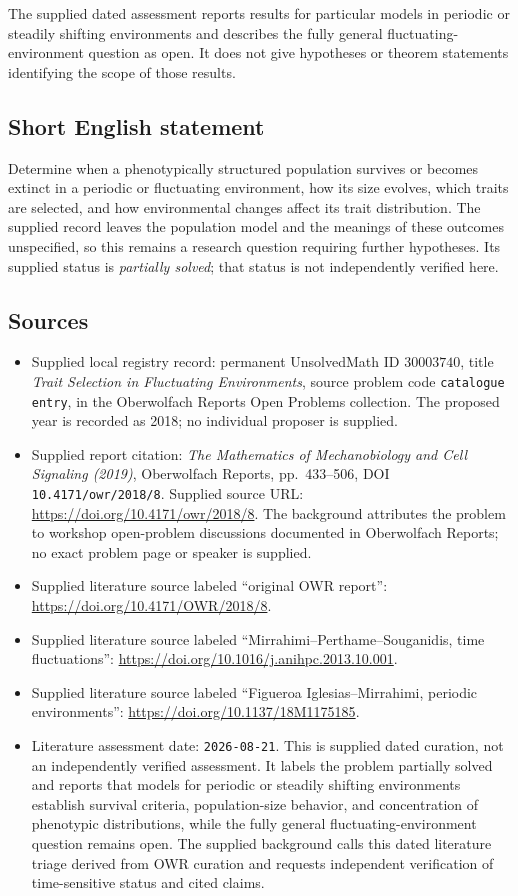 \documentclass[11pt]{article}
\begin{document}
The supplied dated assessment reports results for particular models in periodic or steadily shifting environments and describes the fully general fluctuating-environment question as open. It does not give hypotheses or theorem statements identifying the scope of those results.
\subsection{Short English statement}
Determine when a phenotypically structured population survives or becomes extinct in a periodic or fluctuating environment, how its size evolves, which traits are selected, and how environmental changes affect its trait distribution. The supplied record leaves the population model and the meanings of these outcomes unspecified, so this remains a research question requiring further hypotheses. Its supplied status is \emph{partially solved}; that status is not independently verified here.
\subsection{Sources}
\begin{itemize}
\item Supplied local registry record: permanent UnsolvedMath ID \(30003740\), title \emph{Trait Selection in Fluctuating Environments}, source problem code \texttt{catalogue entry}, in the Oberwolfach Reports Open Problems collection. The proposed year is recorded as 2018; no individual proposer is supplied.
\item Supplied report citation: \emph{The Mathematics of Mechanobiology and Cell Signaling (2019)}, Oberwolfach Reports, pp.\ 433--506, DOI \texttt{10.4171/owr/2018/8}. Supplied source URL: \url{https://doi.org/10.4171/owr/2018/8}. The background attributes the problem to workshop open-problem discussions documented in Oberwolfach Reports; no exact problem page or speaker is supplied.
\item Supplied literature source labeled ``original OWR report'': \url{https://doi.org/10.4171/OWR/2018/8}.
\item Supplied literature source labeled ``Mirrahimi--Perthame--Souganidis, time fluctuations'': \url{https://doi.org/10.1016/j.anihpc.2013.10.001}.
\item Supplied literature source labeled ``Figueroa Iglesias--Mirrahimi, periodic environments'': \url{https://doi.org/10.1137/18M1175185}.
\item Literature assessment date: \texttt{2026-08-21}. This is supplied dated curation, not an independently verified assessment. It labels the problem partially solved and reports that models for periodic or steadily shifting environments establish survival criteria, population-size behavior, and concentration of phenotypic distributions, while the fully general fluctuating-environment question remains open. The supplied background calls this dated literature triage derived from OWR curation and requests independent verification of time-sensitive status and cited claims.
\end{itemize}
\end{document}
